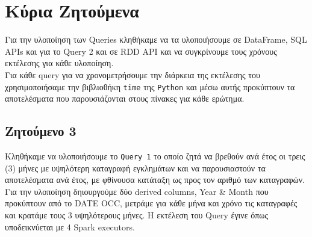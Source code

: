\documentclass{article}
\begin{document}
\section*{Κύρια Ζητούμενα}
\label{sec:main_z}
Για την υλοποίηση των  Queries  κληθήκαμε να τα υλοποιήσουμε σε  DataFrame, SQL APIs  και για το  Query 2  και σε  RDD API  και να συγκρίνουμε τους χρόνους εκτέλεσης για κάθε υλοποίηση.\\
Για κάθε  query  για να χρονομετρήσουμε την διάρκεια της εκτέλεσης του χρησιμοποιήσαμε την βιβλιοθήκη  \texttt{time}  της  \texttt{Python}  και μέσω αυτής προκύπτουν τα αποτελέσματα που παρουσιάζονται στους πίνακες για κάθε ερώτημα. 



\subsection*{Ζητούμενο 3}
\label{subsec:Z3}


Κληθήκαμε να υλοποιήσουμε το  \texttt{Query 1}  το οποίο ζητά να βρεθούν ανά έτος οι τρεις (3) μήνες με υψηλότερη καταγραφή εγκλημάτων και να παρουσιαστούν τα αποτελέσματα ανά έτος, με φθίνουσα κατάταξη ως προς τον αριθμό των καταγραφών. Για την υλοποίηση δηιουργούμε δύο  derived columns, Year \& Month  που προκύπτουν από το  DATE OCC,  μετράμε για κάθε μήνα και χρόνο τις καταγραφές και κρατάμε τους 3 υψηλότερους μήνες. Η εκτέλεση του  Query  έγινε όπως υποδεικνύεται με 4 Spark executors.\\
\\
\end{document}
